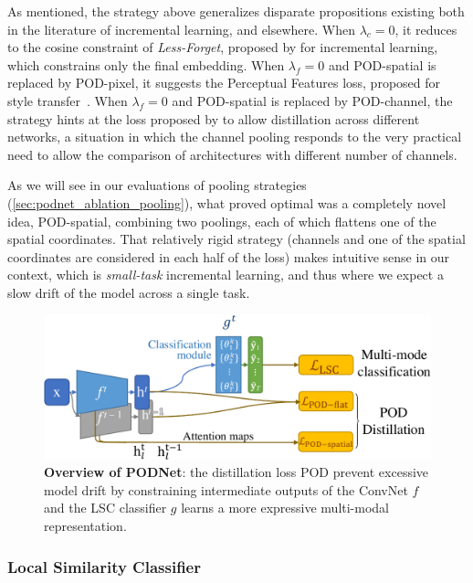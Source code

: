 As mentioned, the strategy above generalizes disparate propositions existing both in the literature
of incremental learning, and elsewhere. When $\lambda_{c}=0$, it reduces to the cosine constraint of
\textit{Less-Forget}, proposed by \cite{hou2019ucir} for incremental learning, which constrains only the
final embedding. When $\lambda_{f}=0$ and POD-spatial is replaced by POD-pixel,
it suggests the Perceptual Features loss, proposed for style
transfer~\citep{johnson2016perceptual_losses}. When $\lambda_{f}=0$ and POD-spatial is replaced by
POD-channel, the strategy hints at the loss proposed by \cite{zagoruyko2016distillation_attention}
to allow distillation across different networks, a situation in which the channel pooling responds
to the very practical need to allow the comparison of architectures with different number of
channels.

As we will see in our evaluations of pooling strategies (\autoref{sec:podnet_ablation_pooling}),
what proved optimal was a completely novel idea, POD-spatial, combining two poolings, each of which
flattens one of the spatial coordinates. That relatively rigid strategy (channels and one of the
spatial coordinates are considered in each half of the loss) makes intuitive sense in our context,
which is \textit{small-task} incremental learning, and thus where we expect a slow drift of the
model across a single task.


\begin{figure}[t]
    \begin{center}
        \includegraphics[width=0.8\linewidth]{images/podnet/model}
    \end{center}
    \caption{\textbf{Overview of PODNet}: the distillation loss \ac{POD} prevent excessive model drift by
        constraining intermediate outputs of the \ac{ConvNet} $f$ and the \ac{LSC} classifier $g$ learns a
        more expressive multi-modal representation.}
    \label{fig:podnet_model}
\end{figure}

\subsubsection{Local Similarity Classifier}
\label{sec:podnet_local_classifier}

